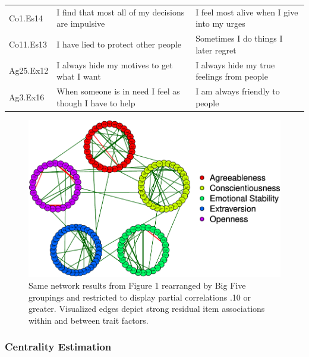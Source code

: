 \documentclass[man]{apa6}
\begin{document}
\begin{table}[!h]
{\begin{tabular}[t]{lll}
Co1.Es14 & I find that most all of my decisions are impulsive & I feel most alive when I give into my urges\\
\addlinespace
Co11.Es13 & I have lied to protect other people & Sometimes I do things I later regret\\
Ag25.Ex12 & I always hide my motives to get what I want & I always hide my true feelings from people\\
Ag3.Ex16 & When someone is in need I feel as though I have to help & I am always friendly to people\\
\bottomrule
\end{tabular}}
\end{table}

\begin{figure}
\centering
\includegraphics{Ideal_Point_Items_and_Network_Analysis_files/figure-latex/unnamed-chunk-6-1.pdf}
\caption{\label{fig:unnamed-chunk-6}Same network results from Figure 1
rearranged by Big Five groupings and restricted to display partial
correlations .10 or greater. Visualized edges depict strong residual
item associations within and between trait factors.}
\end{figure}

\subsubsection{Centrality Estimation}\label{centrality-estimation}
\end{document}

